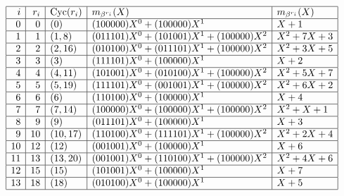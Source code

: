 {\renewcommand{\arraystretch}{1.5}
$$
\begin{array}{|r|r|l|l|l|}
\hline
i & r_i & {\rm Cyc}(r_i) & m_{\beta^{r_i}}(X) & m_{\beta^{r_i}}(X) \\
\hline
0 & 0 & ( 0 ) & (100000)  X^{0} + (100000)  X^{1} & X + 1\\
\hline
1 & 1 & ( 1, 8 ) & (011101)  X^{0} + (101001)  X^{1} + (100000)  X^{2} & X^{2} + 7X + 3\\
\hline
2 & 2 & ( 2, 16 ) & (010100)  X^{0} + (011101)  X^{1} + (100000)  X^{2} & X^{2} + 3X + 5\\
\hline
3 & 3 & ( 3 ) & (111101)  X^{0} + (100000)  X^{1} & X + 2\\
\hline
4 & 4 & ( 4, 11 ) & (101001)  X^{0} + (010100)  X^{1} + (100000)  X^{2} & X^{2} + 5X + 7\\
\hline
5 & 5 & ( 5, 19 ) & (111101)  X^{0} + (001001)  X^{1} + (100000)  X^{2} & X^{2} + 6X + 2\\
\hline
6 & 6 & ( 6 ) & (110100)  X^{0} + (100000)  X^{1} & X + 4\\
\hline
7 & 7 & ( 7, 14 ) & (100000)  X^{0} + (100000)  X^{1} + (100000)  X^{2} & X^{2} + X + 1\\
\hline
8 & 9 & ( 9 ) & (011101)  X^{0} + (100000)  X^{1} & X + 3\\
\hline
9 & 10 & ( 10, 17 ) & (110100)  X^{0} + (111101)  X^{1} + (100000)  X^{2} & X^{2} + 2X + 4\\
\hline
10 & 12 & ( 12 ) & (001001)  X^{0} + (100000)  X^{1} & X + 6\\
\hline
11 & 13 & ( 13, 20 ) & (001001)  X^{0} + (110100)  X^{1} + (100000)  X^{2} & X^{2} + 4X + 6\\
\hline
12 & 15 & ( 15 ) & (101001)  X^{0} + (100000)  X^{1} & X + 7\\
\hline
13 & 18 & ( 18 ) & (010100)  X^{0} + (100000)  X^{1} & X + 5\\
\hline
\end{array}
$$}
